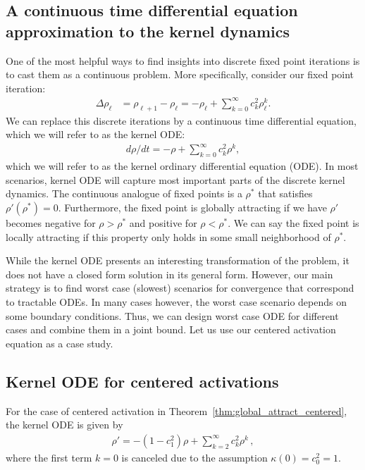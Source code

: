\documentclass[twoside]{article}
\theoremstyle{definition}
\begin{document}
\subsection*{A continuous time differential equation approximation to the kernel dynamics} 
One of the most helpful ways to find insights into discrete fixed point iterations is to cast them as a continuous problem. More specifically, consider our fixed point iteration: 
\begin{align*}
    \Delta \rho_\ell &= \rho_{\ell+1} - \rho_\ell = - \rho_\ell + \sum_{k=0}^\infty c_k^2 \rho^k_\ell.
\end{align*}
We can replace this discrete iterations by a continuous time differential equation, which we will refer to as the kernel ODE:
\begin{align}\tag{kernel ODE}\label{eq:kernel_ODE}
    d\rho/dt = -\rho + \sum_{k=0}^\infty c_k^2 \rho^k,
\end{align}
which we will refer to as the kernel ordinary differential equation (ODE). In most scenarios, kernel ODE will capture most important parts of the discrete kernel dynamics.  The continuous analogue of fixed points is a $\rho^*$ that satisfies $\rho'(\rho^*) = 0.$ Furthermore, the fixed point is globally attracting if we have $\rho'$ becomes negative for $\rho>\rho^*$ and positive for $\rho<\rho^*.$ We can say the fixed point is locally attracting if this property only holds in some small neighborhood of $\rho^*.$

While the kernel ODE presents an interesting transformation of the problem, it does not have a closed form solution in its general form. However, our main strategy is to find worst case (slowest) scenarios for convergence that correspond to tractable ODEs. In many cases however, the worst case scenario depends on some boundary conditions. Thus, we can design worst case ODE for different cases and combine them in a joint bound. Let us use our centered activation equation as a case study. 

\subsection*{Kernel ODE for centered activations}
For the case of centered activation in Theorem~\ref{thm:global_attract_centered}, the kernel ODE is given by
\begin{align*}
    \rho' = -(1-c_1^2)\rho + \sum_{k=2}^\infty c_k^2\rho^k\,,
\end{align*}
where the first term $k=0$ is canceled due to the assumption $\kappa(0)=c_0^2 = 1.$ 
\end{document}
